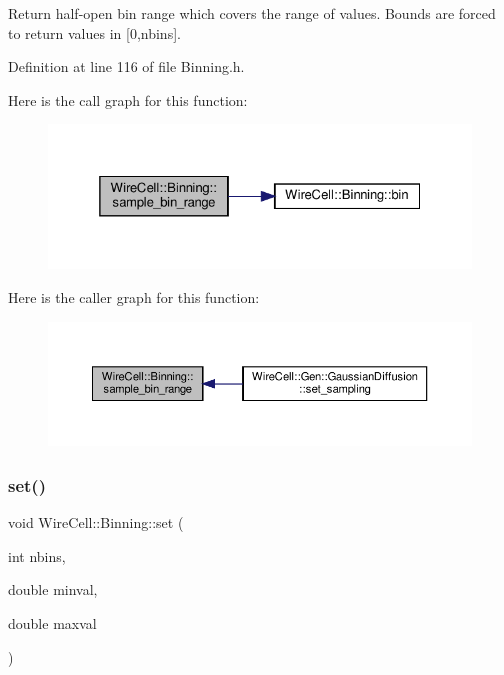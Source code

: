 Return half-\/open bin range which covers the range of values. Bounds are forced to return values in \mbox{[}0,nbins\mbox{]}. 

Definition at line 116 of file Binning.\+h.

Here is the call graph for this function\+:
\nopagebreak
\begin{figure}[H]
\begin{center}
\leavevmode
\includegraphics[width=325pt]{class_wire_cell_1_1_binning_a7f4e8459c55ad288fff22553d8ed8cdd_cgraph}
\end{center}
\end{figure}
Here is the caller graph for this function\+:
\nopagebreak
\begin{figure}[H]
\begin{center}
\leavevmode
\includegraphics[width=350pt]{class_wire_cell_1_1_binning_a7f4e8459c55ad288fff22553d8ed8cdd_icgraph}
\end{center}
\end{figure}
\mbox{\label{class_wire_cell_1_1_binning_a6bbcf5f258e115803cbd83cb25f839d4}} 
\subsubsection{\texorpdfstring{set()}{set()}}
{\footnotesize\ttfamily void Wire\+Cell\+::\+Binning\+::set (\begin{DoxyParamCaption}\item[{int}]{nbins,  }\item[{double}]{minval,  }\item[{double}]{maxval }\end{DoxyParamCaption})\hspace{0.3cm}{\ttfamily [inline]}}



